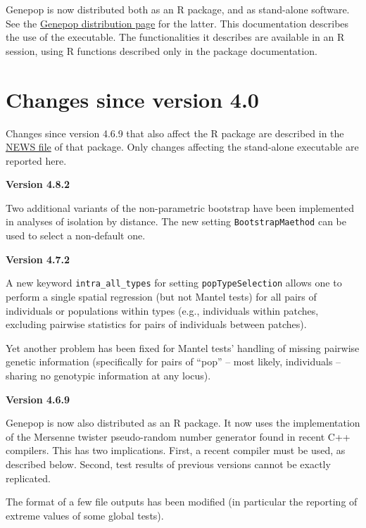 \documentclass[
  12pt,
]{book}
\begin{document}
Genepop is now distributed both as an R package, and as stand-alone software. See the \href{https://kimura.univ-montp2.fr/~rousset/Genepop.htm}{Genepop distribution page} for the latter. This documentation describes the use of the executable. The functionalities it describes are available in an R session, using R functions described only in the package documentation.

\hypertarget{changes-since-version-4.0}{%
\section{Changes since version 4.0}\label{changes-since-version-4.0}}


Changes since version 4.6.9 that also affect the R package are described in the \href{https://cran.r-project.org/package=genepop/news.html}{NEWS file} of that package. Only changes affecting the stand-alone executable are reported here.

\textbf{Version 4.8.2}

Two additional variants of the non-parametric bootstrap have been implemented in analyses of isolation by distance. The new setting \texttt{BootstrapMaethod} can be used to select a non-default one.

\textbf{Version 4.7.2}

A new keyword \texttt{intra\_all\_types} for setting \texttt{popTypeSelection} allows one to perform a single spatial regression (but not Mantel tests) for all pairs of individuals or populations within types (e.g., individuals within patches, excluding pairwise statistics for pairs of individuals between patches).

Yet another problem has been fixed for Mantel tests' handling of missing pairwise genetic information (specifically for pairs of ``pop'' -- most likely, individuals -- sharing no genotypic information at any locus).

\textbf{Version 4.6.9}

Genepop is now also distributed as an R package.
It now uses the implementation of the Mersenne twister pseudo-random number generator found in recent C++ compilers. This has two implications. First, a recent compiler must be used, as described below. Second, test results of previous versions cannot be exactly replicated.

The format of a few file outputs has been modified (in particular the reporting of extreme values of some global tests).
\end{document}

